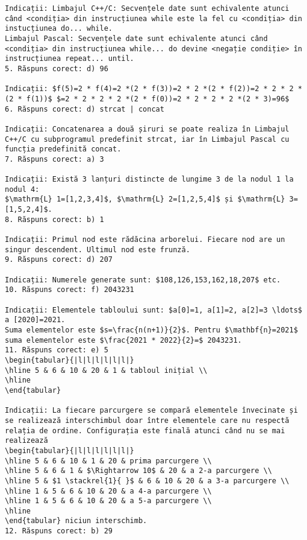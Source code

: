 \begin{verbatim}
Indicații: Limbajul C++/C: Secvențele date sunt echivalente atunci când <condiția> din instrucțiunea while este la fel cu <condiția> din instucțiunea do... while.
Limbajul Pascal: Secvențele date sunt echivalente atunci când <condiția> din instrucțiunea while... do devine <negație condiție> în instrucțiunea repeat... until.
5. Răspuns corect: d) 96

Indicații: $f(5)=2 * f(4)=2 *(2 * f(3))=2 * 2 *(2 * f(2))=2 * 2 * 2 *(2 * f(1))$ $=2 * 2 * 2 * 2 *(2 * f(0))=2 * 2 * 2 * 2 *(2 * 3)=96$
6. Răspuns corect: d) strcat | concat

Indicații: Concatenarea a două șiruri se poate realiza în Limbajul C++/C cu subprogramul predefinit strcat, iar în Limbajul Pascal cu funcția predefinită concat.
7. Răspuns corect: a) 3

Indicații: Există 3 lanțuri distincte de lungime 3 de la nodul 1 la nodul 4:
$\mathrm{L} 1=[1,2,3,4]$, $\mathrm{L} 2=[1,2,5,4]$ și $\mathrm{L} 3=[1,5,2,4]$.
8. Răspuns corect: b) 1

Indicații: Primul nod este rădăcina arborelui. Fiecare nod are un singur descendent. Ultimul nod este frunză.
9. Răspuns corect: d) 207

Indicații: Numerele generate sunt: $108,126,153,162,18,207$ etc.
10. Răspuns corect: f) 2043231

Indicații: Elementele tabloului sunt: $a[0]=1, a[1]=2, a[2]=3 \ldots$ a [2020]=2021.
Suma elementelor este $s=\frac{n(n+1)}{2}$. Pentru $\mathbf{n}=2021$ suma elementelor este $\frac{2021 * 2022}{2}=$ 2043231.
11. Răspuns corect: e) 5
\begin{tabular}{|l|l|l|l|l|l|}
\hline 5 & 6 & 10 & 20 & 1 & tabloul inițial \\
\hline
\end{tabular}

Indicații: La fiecare parcurgere se compară elementele învecinate și se realizează interschimbul doar între elementele care nu respectă relația de ordine. Configurația este finală atunci când nu se mai realizează
\begin{tabular}{|l|l|l|l|l|l|}
\hline 5 & 6 & 10 & 1 & 20 & prima parcurgere \\
\hline 5 & 6 & 1 & $\Rightarrow 10$ & 20 & a 2-a parcurgere \\
\hline 5 & $1 \stackrel{1}{ }$ & 6 & 10 & 20 & a 3-a parcurgere \\
\hline 1 & 5 & 6 & 10 & 20 & a 4-a parcurgere \\
\hline 1 & 5 & 6 & 10 & 20 & a 5-a parcurgere \\
\hline
\end{tabular} niciun interschimb.
12. Răspuns corect: b) 29


\end{verbatim}
